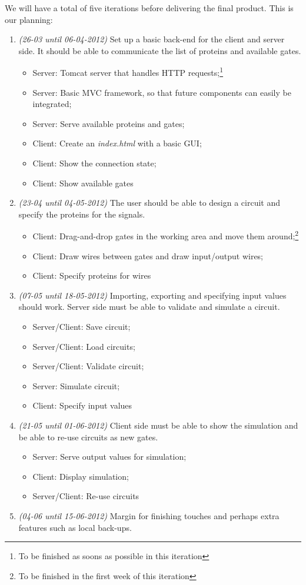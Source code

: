 \documentclass[a4paper]{article}
\begin{document}
\noindent We will have a total of five iterations before delivering the final product. This is our planning:
\begin{enumerate}
\item \emph{(26-03 until 06-04-2012)} Set up a basic back-end for the client and server side. It should be able to communicate the list of proteins and available gates.
	\begin{itemize}
	\item Server: Tomcat server that handles HTTP requests;\footnote[1]{To be finished as soons as possible in this iteration}
	\item Server: Basic MVC framework, so that future components can easily be integrated;\footnotemark[1]
	\item Server: Serve available proteins and gates;
	\item Client: Create an \emph{index.html} with a basic GUI;\footnotemark[1]
	\item Client: Show the connection state;
	\item Client: Show available gates
	\end{itemize}
\item \emph{(23-04 until 04-05-2012)} The user should be able to design a circuit and specify the proteins for the signals.
	\begin{itemize}
	\item Client: Drag-and-drop gates in the working area and move them around;\footnote[2]{To be finished in the first week of this iteration}
	\item Client: Draw wires between gates and draw input/output wires;
	\item Client: Specify proteins for wires
	\end{itemize}
\item \emph{(07-05 until 18-05-2012)} Importing, exporting and specifying input values should work. Server side must be able to validate and simulate a circuit.
	\begin{itemize}
	\item Server/Client: Save circuit;\footnotemark[2]
	\item Server/Client: Load circuits;\footnotemark[2]
	\item Server/Client: Validate circuit;\footnotemark[2]
	\item Server: Simulate circuit;
	\item Client: Specify input values
	\end{itemize}
\item \emph{(21-05 until 01-06-2012)} Client side must be able to show the simulation and be able to re-use circuits as new gates.
	\begin{itemize}
	\item Server: Serve output values for simulation;\footnotemark[2]
	\item Client: Display simulation;
	\item Server/Client: Re-use circuits
	\end{itemize}
\item \emph{(04-06 until 15-06-2012)} Margin for finishing touches and perhaps extra features such as local back-ups.
\end{enumerate}
\end{document}
